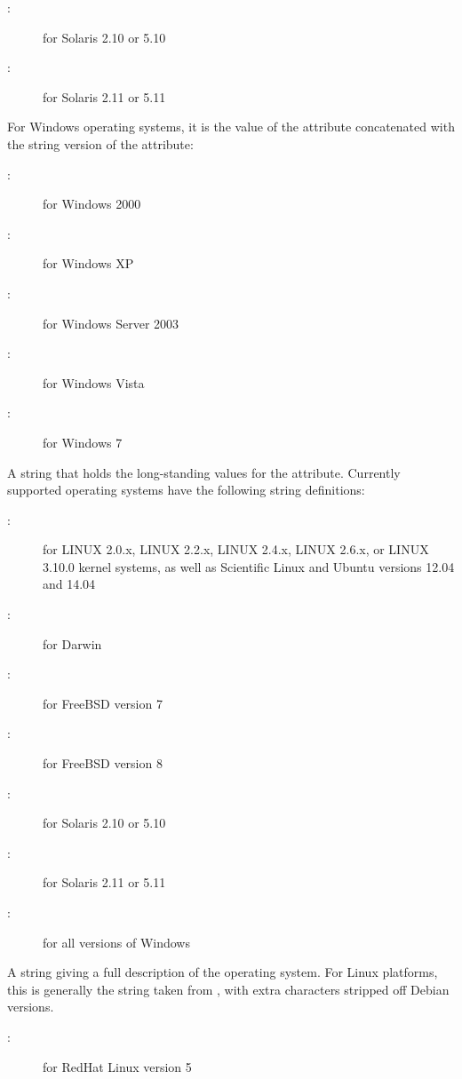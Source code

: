 \begin{description}
	\begin{description}
	\item[:] for Solaris 2.10 or 5.10
	\item[:] for Solaris 2.11 or 5.11
	\end{description}
For Windows operating systems, it is the value of the  attribute 
concatenated with the string version of the  attribute:
	\begin{description}
	\item[:] for Windows 2000
	\item[:] for Windows XP
	\item[:] for Windows Server 2003
	\item[:] for Windows Vista
	\item[:] for Windows 7
	\end{description}
%
\item[\AdAttr{OpSysLegacy}:] A string that holds the long-standing values for the  attribute.
Currently supported operating systems have the following string
definitions:
	\begin{description}
	\item[:] for LINUX 2.0.x, LINUX 2.2.x, LINUX 2.4.x, LINUX 2.6.x, or LINUX 3.10.0 kernel systems, as well as Scientific Linux and  Ubuntu 
versions 12.04 and 14.04
	\item[:] for Darwin
	\item[:] for FreeBSD version 7
	\item[:] for FreeBSD version 8
	\item[:] for Solaris 2.10 or 5.10
	\item[:] for Solaris 2.11 or 5.11
	\item[:] for all versions of Windows
	\end{description}
%
\item[\AdAttr{OpSysLongName}:] A string giving a full description of 
the operating system.
For Linux platforms, this is generally the string taken from ,
with extra characters stripped off Debian versions.
	\begin{description}
	\item[:] for RedHat Linux version 5

\end{description}
\end{description}
